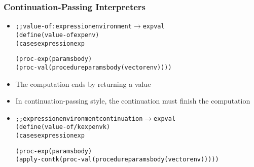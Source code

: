 \documentclass{beamer}
\newcommand{\arrow}{\(\rightarrow\)}
\begin{document}
\begin{frame}[fragile]
\frametitle{Continuation-Passing Interpreters}
\begin{scriptsize}
\begin{itemize}
\item<1->
\begin{alltt}
;; value-of : expression environment \arrow{} expval
(define (value-of exp env)
  (cases expression exp

    (proc-exp (params body)
              (proc-val (procedure params body (vector env))))
\end{alltt}

\item<1-> The computation ends by returning a value

\item<1-> In continuation-passing style, the continuation must finish the computation

\item<2->
\begin{alltt}
;; expression environment continuation \arrow{} expval
(define (value-of/k exp env k)
 (cases expression exp

  (proc-exp (params body)
   (apply-cont k (proc-val (procedure params body (vector env)))))
\end{alltt}

\end{itemize}
\end{scriptsize}
\end{frame}
\end{document}

